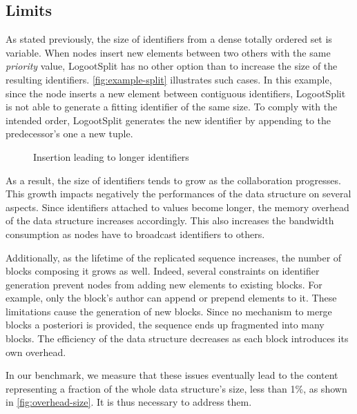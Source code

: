 \documentclass[sigplan,10pt]{acmart}
\newcommand{\trm}[1]{\mathit{#1}}
\newcommand{\id}[4]{$\trm{#1}^{\trm{#2}, \trm{#3}}_{\trm{#4}}$}
\newcommand{\widthletter}{6mm}
\newcommand{\widthblock}{10mm}
\begin{document}
\subsection{Limits}

As stated previously, the size of identifiers from a dense totally ordered set is variable.
When nodes insert new elements between two others with the same \emph{priority} value, LogootSplit has no other option than to increase the size of the resulting identifiers.
\autoref{fig:example-split} illustrates such cases.
In this example, since the node inserts a new element between contiguous identifiers, LogootSplit is not able to generate a fitting identifier of the same size. To comply with the intended order, LogootSplit generates the new identifier by appending to the predecessor's one a new tuple.

\begin{figure}
    \centering
    \caption{Insertion leading to longer identifiers}
    \label{fig:example-split}
\end{figure}

As a result, the size of identifiers tends to grow as the collaboration progresses.
This growth impacts negatively the performances of the data structure on several aspects.
Since identifiers attached to values become longer, the memory overhead of the data structure increases accordingly.
This also increases the bandwidth consumption as nodes have to broadcast identifiers to others.

Additionally, as the lifetime of the replicated sequence increases, the number of blocks composing it grows as well.
Indeed, several constraints on identifier generation prevent nodes from adding new elements to existing blocks.
For example, only the block's author can append or prepend elements to it.
These limitations cause the generation of new blocks.
Since no mechanism to merge blocks a posteriori is provided, the sequence ends up fragmented into many blocks.
The efficiency of the data structure decreases as each block introduces its own overhead.

In our benchmark, we measure that these issues eventually lead to the content representing a fraction of the whole data structure's size, less than 1\%, as shown in \autoref{fig:overhead-size}. It is thus necessary to address them.
\end{document}
